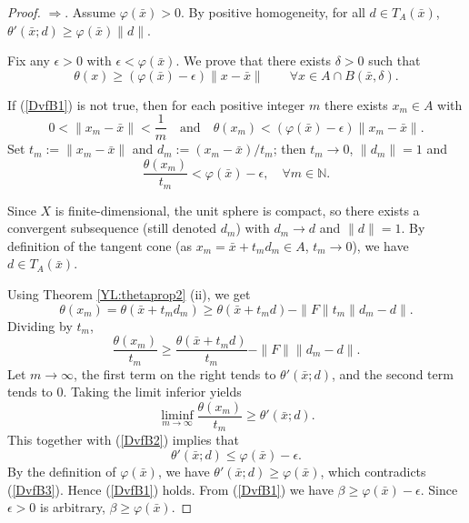 \documentclass[11pt]{article}
\begin{document}
  
 
 
 
\begin{proof}    $\Rightarrow$.   Assume $\varphi (\bar x) > 0$. By positive homogeneity, for all $d \in T_A(\bar x)$, $\theta'(\bar x; d) \ge \varphi (\bar x) \|d\|$.
 
 Fix any $\epsilon >0$ with $\epsilon <	\varphi (\bar x)$. We prove that there exists $\delta > 0$ such that
 \begin{equation}\label{DvfB1}
 	\theta(x) \ge \left( 	\varphi (\bar x)-\epsilon \right) \|x - \bar x\| \qquad \forall x \in A \cap B(\bar x, \delta).
 \end{equation}
 
 
 
 If (\ref{DvfB1}) is not true, then for each positive integer $m$ there exists $x_m \in A$ with
 \[
 0 < \|x_m - \bar x\| < \frac{1}{m} \quad\text{and}\quad \theta(x_m) < \left( 	\varphi (\bar x) - \epsilon \right) \|x_m - \bar x\|.
 \]
 Set $t_m := \|x_m - \bar x\|$ and $d_m := (x_m - \bar x)/t_m$; then    $t_m   \to 0  $,     $\|d_m\| = 1$ and
 \begin{equation}\label{DvfB2}
 	\frac{\theta(x_m)}{t_m} < 	\varphi (\bar x) -\epsilon , \quad \forall m    \in \mathbb{N}.  
 \end{equation}
 
 Since $X$ is finite-dimensional, the unit sphere is compact, so there exists a convergent subsequence (still denoted $d_m$) with $d_m \to d$ and $\|d\| = 1$. By definition of the tangent cone (as $x_m = \bar x + t_m d_m \in A$, $t_m \to 0$),     we have      $d \in T_A(\bar x)$.
 
 Using Theorem   \ref{YL:thetaprop2} (ii),  we get
 \[
 \theta(x_m) = \theta(\bar x + t_m d_m) \ge \theta(\bar x + t_m d) - \|F\|  t_m \|d_m - d\|.
 \]
 Dividing by $t_m$,
 \[
 \frac{\theta(x_m)}{t_m} \ge \frac{\theta(\bar x + t_m d)}{t_m} - \|F\| \|d_m - d\|.
 \]
 Let $m \to \infty$, the first term on the right tends to $\theta'(\bar x; d)$, and the second term tends to $0$. Taking the limit inferior yields
 \[
 \liminf_{m \to \infty} \frac{\theta(x_m)}{t_m} \ge \theta'(\bar x; d).
 \]
 This together with  (\ref{DvfB2})  implies that 
 \begin{equation}\label{DvfB3}
 \theta'(\bar x; d) \le 	\varphi (\bar x) -\epsilon. 
  \end{equation}
  By the definition of $\varphi (\bar x)$,  we have $\theta'(\bar x; d) \ge 	\varphi (\bar x)$,  which contradicts (\ref{DvfB3}). 
  Hence (\ref{DvfB1}) holds.
 From (\ref{DvfB1}) we have $\beta \ge 	\varphi (\bar x) -\epsilon$. Since $\epsilon>0$ is arbitrary, $\beta \ge 	\varphi (\bar x)$.
 

\end{proof}
\end{document}
